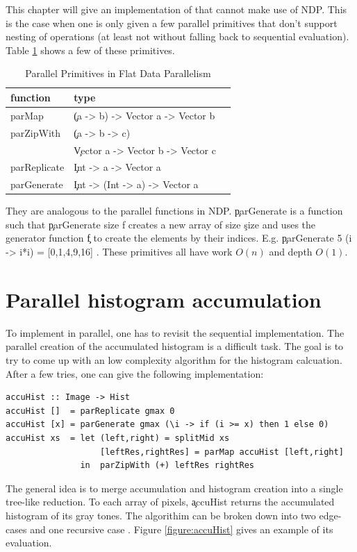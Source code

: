

This chapter will give an implementation of \algo
that cannot make use of NDP. This is
the case when one is only given a few parallel primitives
that don't support nesting
of operations (at least not without falling back to sequential evaluation).
Table \ref{table:parprims} shows a few of these primitives.

  \begin{table}[h!]
    \caption{Parallel Primitives in Flat Data Parallelism}
    \label{table:parprims}
    \begin{center}
    \begin{tabular}{lll}
      \toprule
      function & type \\
      \midrule
      parMap & \c{(a -> b) -> Vector a -> Vector b} \\
      parZipWith & \c{(a -> b -> c)} \\
       & \c{Vector a -> Vector b -> Vector c} \\
      parReplicate & \c{Int -> a -> Vector a} \\
      parGenerate & \c{Int -> (Int -> a) -> Vector a} \\
    \end{tabular}
    \end{center}
  \end{table}
  They are analogous to the parallel functions in NDP.
  \c{parGenerate} is a function such that \c{parGenerate size f} creates a new array
  of size \c{size} and uses the generator function \c{f} to create
  the elements by their indices.
  E.g. \c{parGenerate 5 (\lam i -> i*i) = [0,1,4,9,16] }.
  These primitives all have work $O(n)$ and depth $O(1)$.
  
\section{Parallel histogram accumulation}
  To implement \algo in parallel, one has to revisit the sequential
  implementation. The parallel creation of the accumulated histogram is
  a difficult task. The goal is to try to come up with
  an low complexity algorithm for the histogram calcuation.
  After a few tries, one can give the following implementation:
  
  \begin{lstlisting}
accuHist :: Image -> Hist
accuHist []  = parReplicate gmax 0
accuHist [x] = parGenerate gmax (\i -> if (i >= x) then 1 else 0)
accuHist xs  = let (left,right) = splitMid xs
                   [leftRes,rightRes] = parMap accuHist [left,right]
               in  parZipWith (+) leftRes rightRes
  \end{lstlisting}
  The general idea is to merge accumulation and histogram creation
  into a single tree-like reduction. To each array of pixels, \c{accuHist}
  returns the accumulated histogram of its gray tones.
  The algorithim can be broken down into two edge-cases and one recursive case
  . Figure \ref{figure:accuHist} gives an example of its evaluation.
  
